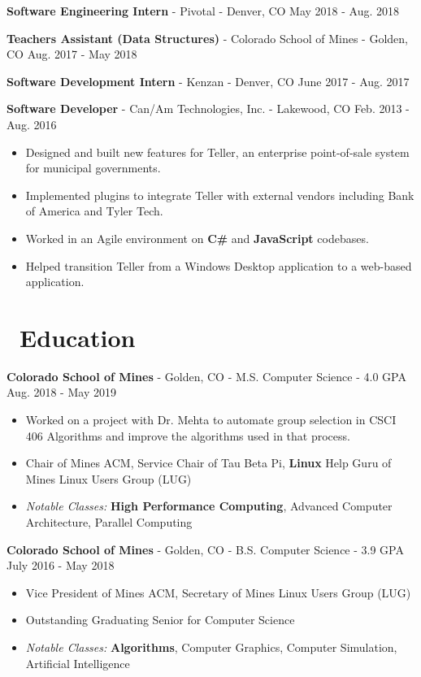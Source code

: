 \documentclass[10pt,letterpaper]{article}
\begin{document}
\textbf{Software Engineering Intern} - Pivotal - Denver, CO
\hfill May 2018 - Aug. 2018

\vspace{2pt}
\textbf{Teachers Assistant (Data Structures)} - Colorado School of Mines -
Golden, CO \hfill Aug. 2017 - May 2018

\vspace{2pt}
\textbf{Software Development Intern} - Kenzan - Denver, CO
\hfill June 2017 - Aug. 2017

\vspace{2pt}
\textbf{Software Developer} - Can/Am Technologies, Inc. - Lakewood, CO
\hfill Feb. 2013 - Aug. 2016
\begin{itemize}
    \item Designed and built new features for Teller, an enterprise
        point-of-sale system for municipal governments.
    \item Implemented plugins to integrate Teller with external vendors
        including Bank of America and Tyler Tech.
    \item Worked in an Agile environment on \textbf{C\#} and \textbf{JavaScript}
        codebases.
    \item Helped transition Teller from a Windows Desktop application to a
        web-based application.
\end{itemize}

\section*{\faBook\ Education}
\textbf{Colorado School of Mines} - Golden, CO - M.S. Computer Science - 4.0 GPA
\hfill Aug. 2018 - May 2019
\begin{itemize}
    \item Worked on a project with Dr. Mehta to automate group selection in
        CSCI 406 Algorithms and improve the algorithms used in that process.
    \item Chair of Mines ACM, Service Chair of Tau Beta Pi, \textbf{Linux} Help
        Guru of Mines Linux Users Group (LUG)
    \item \textit{Notable Classes:} \textbf{High Performance Computing},
        Advanced Computer Architecture, Parallel Computing
\end{itemize}

\textbf{Colorado School of Mines} - Golden, CO - B.S. Computer Science - 3.9 GPA
\hfill July 2016 - May 2018
\begin{itemize}
    \item Vice President of Mines ACM, Secretary of Mines Linux Users Group
        (LUG)
    \item Outstanding Graduating Senior for Computer Science
    \item \textit{Notable Classes:} \textbf{Algorithms}, Computer Graphics,
        Computer Simulation, Artificial Intelligence
\end{itemize}
\end{document}
